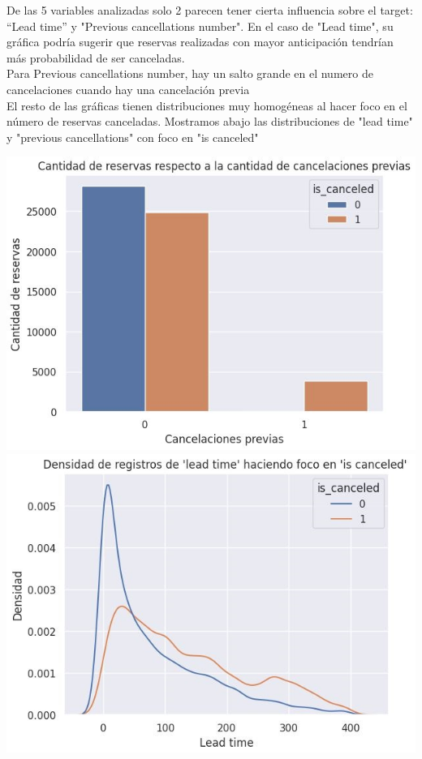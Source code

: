 \documentclass{article}
\begin{document}
De las 5 variables analizadas solo 2 parecen tener cierta influencia sobre el target: “Lead time” y "Previous cancellations number".
En el caso de "Lead time", su gráfica podría sugerir que reservas realizadas con mayor anticipación tendrían más probabilidad de ser canceladas.\\
Para Previous cancellations number, hay un salto grande en el numero de cancelaciones cuando hay una cancelación previa\\
El resto de las gráficas tienen distribuciones muy homogéneas al hacer foco en el número de reservas canceladas. 
Mostramos abajo las distribuciones de "lead time" y "previous cancellations" con foco en "is canceled"

\includegraphics[scale=0.4]{previous_cancellations_num}
    \hspace{2.2cm}
\includegraphics[scale=0.4]{lead_time}
\end{document}
